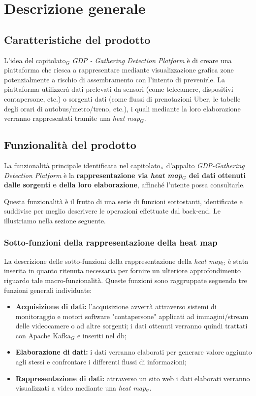 \chapter{Descrizione generale}\label{DescrizioneGenerale}
\section{Caratteristiche del prodotto}\label{DescrizioneGeneraleCaratteristicheProdotto}
L'idea del capitolato$_G$ \textit{GDP - Gathering Detection Platform} è di creare una piattaforma che riesca a rappresentare mediante visualizzazione grafica zone potenzialmente a rischio di assembramento con l'intento di prevenirle.
La piattaforma utilizzerà dati prelevati da sensori (come telecamere, dispositivi contapersone, etc.) o sorgenti dati (come flussi di prenotazioni Uber, le tabelle degli orari di autobus/metro/treno, etc.), i quali mediante la loro elaborazione verranno rappresentati tramite una \textit{heat map$_G$}.

\section{Funzionalità del prodotto}\label{DescrizioneGeneraleFunzionalitàDelProdotto}
La funzionalità principale identificata nel capitolato$_{\scaleto{G}{3pt}}$ d'appalto \textit{GDP-Gathering Detection Platform} è la \textbf{rappresentazione via \textit{heat map$_G$} dei dati ottenuti dalle sorgenti e della loro elaborazione}, affinché l'utente possa consultarle.

Questa funzionalità è il frutto di una serie di funzioni sottostanti, identificate e suddivise per meglio descrivere le operazioni effettuate dal back-end.
Le illustriamo nella sezione seguente.

\subsection{Sotto-funzioni della rappresentazione della heat map}\label{DescrizioneGeneraleFunzionalitàDelProdottoSottoFunzioniDellaRappresentazioneDellaHeatmap}

La descrizione delle sotto-funzioni della rappresentazione della \textit{heat map$_G$} è stata inserita in quanto ritenuta necessaria per fornire un ulteriore approfondimento riguardo tale macro-funzionalità.
Queste funzioni sono raggruppate seguendo tre funzioni generali individuate:
\begin{itemize}
	\item \textbf{Acquisizione di dati:} l'acquisizione avverrà attraverso sistemi di monitoraggio e motori software "contapersone" applicati ad immagini/stream delle videocamere o ad altre sorgenti; i dati ottenuti verranno quindi trattati con Apache Kafka$_G$ e inseriti nel db;
	\item \textbf{Elaborazione di dati:} i dati verranno elaborati per generare valore aggiunto agli stessi e confrontare i differenti flussi di informazioni;
	\item \textbf{Rappresentazione di dati:} attraverso un sito web i dati elaborati verranno visualizzati a video mediante una \textit{heat map$_{\scaleto{G}{3pt}}$}.
\end{itemize}

